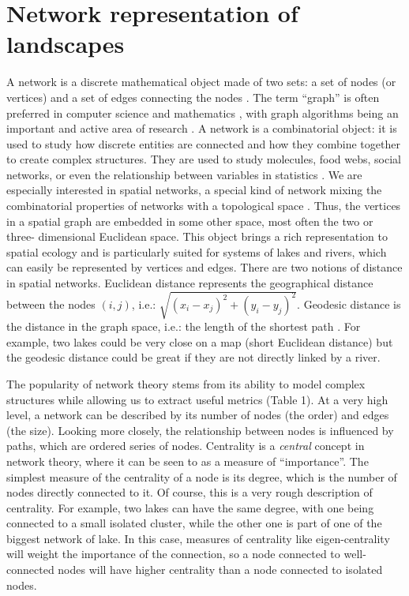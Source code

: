 \documentclass[12pt]{article}
\begin{document}
\section*{Network representation of landscapes}

A network is a discrete mathematical object made of two sets: a set of nodes
(or vertices) and a set of edges connecting the nodes \parencite{new10}. The
term ``graph'' is often preferred in computer science and mathematics
\parencite{gro06}, with graph algorithms being an important and active area of
research \parencite{sed01}. A network is a combinatorial object: it is used to study
how discrete entities are connected and how they combine together to create
complex structures. They are used to study molecules, food webs, social
networks, or even the relationship between variables in statistics
\parencite{wri21,new10}. We are especially interested in spatial networks, a special
kind of network mixing the combinatorial properties of networks with a
topological space \parencite{kob94}. Thus, the vertices in a spatial graph are
embedded in some other space, most often the two or three- dimensional Euclidean
space. This object brings a rich representation to spatial ecology and is
particularly suited for systems of lakes and rivers, which can easily be
represented by vertices and edges. There are two notions of distance in spatial
networks. Euclidean distance represents the geographical distance between the
nodes $(i, j)$, i.e.: $\sqrt{(x_i - x_j)^2 + (y_i - y_ j)^2}$. Geodesic
distance is the distance in the graph space, i.e.: the length of the shortest
path \parencite{dij59}. For example, two lakes could be very close on a map (short
Euclidean distance) but the geodesic distance could be great if they are not
directly linked by a river.

The popularity of network theory stems from its ability to model complex
structures while allowing us to extract useful metrics (Table 1). At a very high
level, a network can be described by its number of nodes (the order) and 
edges (the size). Looking more closely, the relationship between
nodes is influenced by paths, which are ordered series of nodes. Centrality
is a \emph{central} concept in network theory, where it can be seen
to as a measure of ``importance''. The simplest measure of the centrality of a
node is its degree, which is the number of nodes directly connected to it. Of
course, this is a very rough description of centrality. For example, two lakes
can have the same degree, with one being connected to a small isolated cluster,
while the other one is part of one of the biggest network of lake. In this case,
measures of centrality like eigen-centrality will weight the importance of the
connection, so a node connected to well-connected nodes will have higher
centrality than a node connected to isolated nodes.
\end{document}
